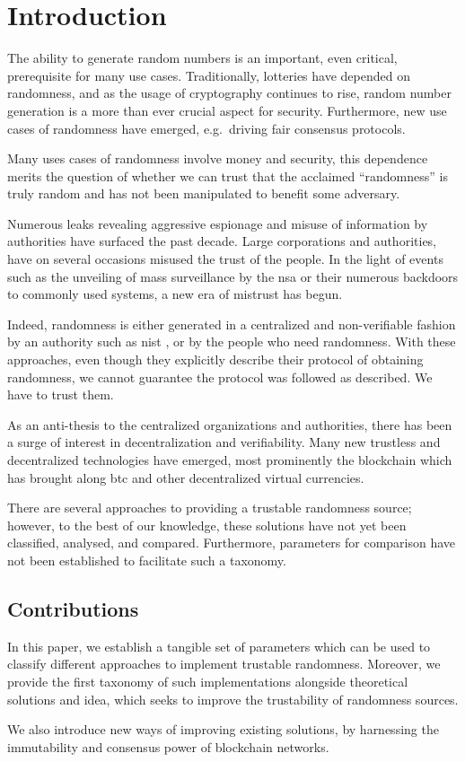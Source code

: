 \section{Introduction}\label{cha:introduction}

The ability to generate random numbers is an important, even critical, prerequisite for many use cases.
Traditionally, lotteries have depended on randomness, and as the usage of cryptography continues to rise, random number generation is a more than ever crucial aspect for security.
Furthermore, new use cases of randomness have emerged, e.g.\ driving fair consensus protocols.

Many uses cases of randomness involve money and security, this dependence merits the question of whether we can trust that the acclaimed \enquote{randomness} is truly random and has not been manipulated to benefit some adversary.

Numerous leaks revealing aggressive espionage and misuse of information by authorities have surfaced the past decade.
Large corporations and authorities, have on several occasions misused the trust of the people.
In the light of events such as the unveiling of mass surveillance by the \gls{nsa} or their numerous backdoors to commonly used systems, a new era of mistrust has begun.

Indeed, randomness is either generated in a centralized and non-verifiable fashion by an authority such as \gls{nist} , or by the people who need randomness.
With these approaches, even though they explicitly describe their protocol of obtaining randomness, we cannot guarantee the protocol was followed as described.
We have to trust them. 

As an anti-thesis to the centralized organizations and authorities, there has been a surge of interest in decentralization and verifiability.
Many new trustless and decentralized technologies have emerged, most prominently the blockchain which has brought along \gls{btc} and other decentralized virtual currencies.

There are several approaches to providing a trustable randomness source; however, to the best of our knowledge, these solutions have not yet been classified, analysed, and compared.
Furthermore, parameters for comparison have not been established to facilitate such a taxonomy.

\subsection*{Contributions}\label{subsec:contributions}
In this paper, we establish a tangible set of parameters which can be used to classify different approaches to implement trustable randomness.
Moreover, we provide the first taxonomy of such implementations alongside theoretical solutions and idea, which seeks to improve the trustability of randomness sources.

We also introduce new ways of improving existing solutions, by harnessing the immutability and consensus power of blockchain networks.

